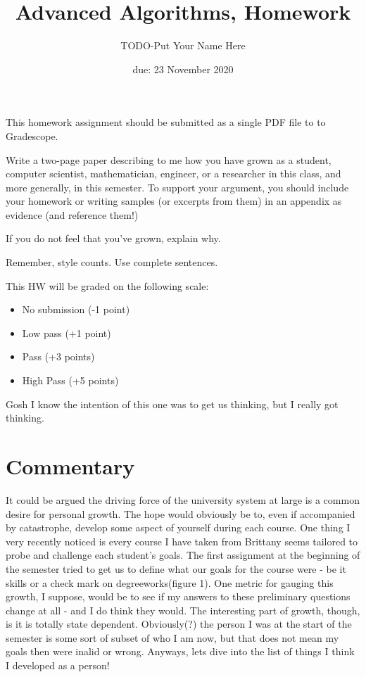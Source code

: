 \documentclass{article}
\title{Advanced Algorithms, Homework \hwnum}
\author{TODO-Put Your Name Here}
\date{due: 23 November 2020}
\begin{document}
\maketitle

This homework assignment should be
submitted as a single PDF file to to Gradescope.

Write a two-page paper describing to me how you have grown as a student,
computer scientist, mathematician, engineer, or a researcher in this class, and
more generally, in this semester.  To support your argument, you should include
your homework or writing samples (or excerpts from them) in an appendix as
evidence (and reference them!)

If you do not feel that you've grown, explain why.

Remember, style counts. Use complete sentences.

This HW will be graded on the following scale:
\begin{itemize}
    \item No submission (-1 point)
    \item Low pass (+1 point)
    \item Pass (+3 points)
    \item High Pass (+5 points)
\end{itemize}
\newpage

Gosh I know the intention of this one was to get us thinking, but I really got thinking.
\section*{Commentary}
It could be argued the driving force of the university system at large is
a common desire for personal growth. The hope would obviously be to, even if accompanied by catastrophe, develop some aspect of yourself during each course. One thing I very recently noticed is every course I have taken from Brittany seems tailored to probe and challenge each student's goals. 
The first assignment at the beginning of the semester tried to get us to define what our goals for the course were - be it skills or a check mark on degreeworks(figure 1). One metric for gauging this growth, I suppose, would be to see if my answers to these preliminary questions change at all - and I do think they would. The interesting part of growth, though, is it is totally state dependent. Obviously(?) the person I was at the start of the semester is some sort of subset of who I am now, but that does not mean my goals then were inalid or wrong. Anyways, lets dive into the list of things I think I developed as a person!
\end{document}
